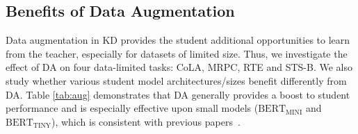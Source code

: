 \documentclass[11pt]{article}
\begin{document}



\subsection{Benefits of Data Augmentation}
\label{sec: DA benefit}
Data augmentation in KD provides the student additional opportunities to learn from the teacher, especially for datasets of limited size. Thus, we investigate the effect of DA on four data-limited tasks: CoLA, MRPC, RTE and STS-B. 
We also study whether various student model architectures/sizes benefit differently from DA. Table \ref{tab:aug} demonstrates that DA generally provides a boost to student performance and is especially effective upon small models ($\text{BERT}_\text{MINI}$ and $\text{BERT}_\text{TINY}$), which is consistent with previous papers~\citep{jiao2019tinybert}.
\end{document}
